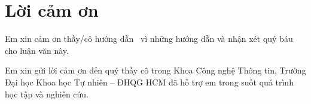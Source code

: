 \chapter*{Lời cảm ơn}\label{thanks}


Em xin cảm ơn thầy/cô hướng dẫn \listSupervisors\ vì những hướng dẫn và nhận xét quý báu cho luận văn này.

Em xin gửi lời cảm ơn đến quý thầy cô trong Khoa Công nghệ Thông tin, Trường Đại học Khoa học Tự nhiên -- ĐHQG HCM đã hỗ trợ em trong suốt quá trình học tập và nghiên cứu.
